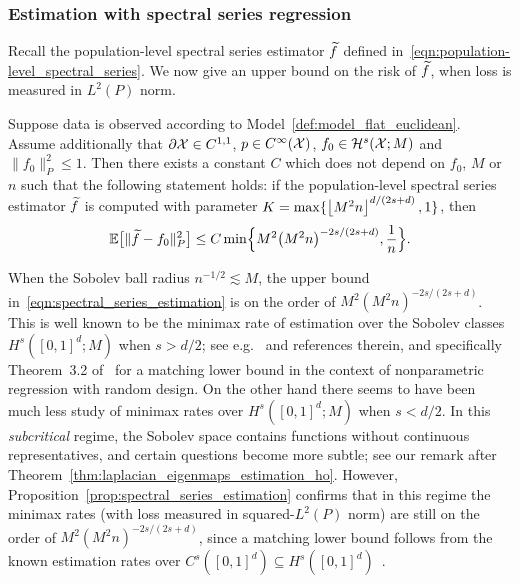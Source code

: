 \subsubsection{Estimation with spectral series regression}
Recall the population-level spectral series estimator $\widetilde{f}$ defined in~\eqref{eqn:population-level_spectral_series}. We now give an upper bound on the risk of $\widetilde{f}$, when loss is measured in $L^2(P)$ norm.
\begin{proposition}
	\label{prop:spectral_series_estimation}
	Suppose data is observed according to Model~\ref{def:model_flat_euclidean}. Assume additionally that $\partial \mathcal{X} \in C^{1,1}$, $p \in C^{\infty}(\mathcal{X})$, $f_0 \in \mathcal{H}^{s}(\mathcal{X};M)$ and $\|f_0\|_P^2 \leq 1$. Then there exists a constant $C$ which does not depend on $f_0$, $M$ or $n$ such that the following statement holds: if the population-level spectral series estimator $\widetilde{f}$ is computed with parameter $K = \max\{\left\lfloor M^2n \right\rfloor^{d/(2s + d)},1\}$, then
	\begin{equation}
	\label{eqn:spectral_series_estimation}
	\mathbb{E}\bigl[\|\widetilde{f} - f_0\|_P^2\bigr] \leq C \min\Bigl\{M^2\bigl(M^2n\bigr)^{-2s/(2s + d)}, \frac{1}{n}\Bigr\}.
	\end{equation}
\end{proposition}
When the Sobolev ball radius $n^{-1/2} \lesssim M$, the upper bound in~\eqref{eqn:spectral_series_estimation} is on the order of $M^2(M^2n)^{-2s/(2s + d)}$. This is well known to be the minimax rate of estimation over the Sobolev classes $H^s([0,1]^d;M)$ when $s > d/2$; see e.g.~\cite{gyorfi2006,wasserman2006,tsybakov08} and references therein, and specifically Theorem~3.2 of~\cite{gyorfi2006} for a matching lower bound in the context of nonparametric regression with random design. On the other hand there seems to have been much less study of minimax rates over $H^s([0,1]^d;M)$ when $s < d/2$. In this \emph{subcritical} regime, the Sobolev space contains functions without continuous representatives, and certain questions become more subtle; see our remark after Theorem~\ref{thm:laplacian_eigenmaps_estimation_ho}. However, Proposition~\ref{prop:spectral_series_estimation} confirms that in this regime the minimax rates (with loss measured in squared-$L^2(P)$ norm) are still on the order of $M^2(M^2n)^{-2s/(2s + d)}$, since a matching lower bound follows from the known estimation rates over $C^s([0,1]^d) \subseteq H^s([0,1]^d)$~\citep{stone1980}.

